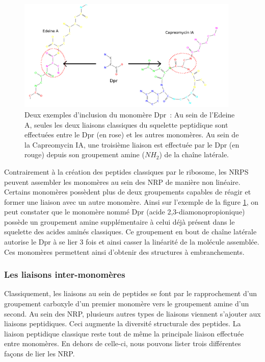 \begin{figure}[h!]
  \begin{center}
    \includegraphics[width=400px]{Figures/bio/Intro/Dpr/2-3_liaisons.png}
    \caption{\label{DPR_incl}Deux exemples d'inclusion du monomère Dpr~:
    Au sein de l'Edeine A, seules les deux liaisons classiques du squelette peptidique sont effectuées entre le Dpr (en rose) et les autres monomères.
    Au sein de la Capreomycin IA, une troisième liaison est effectuée par le Dpr (en rouge) depuis son groupement amine ($NH_2$) de la chaîne latérale.}
  \end{center}
\end{figure}

Contrairement à la création des peptides classiques par le ribosome, les NRPS peuvent assembler les monomères au sein des NRP de manière non linéaire.
Certains monomères possèdent plus de deux groupements capables de réagir et former une liaison avec un autre monomère.
Ainsi sur l'exemple de la figure \ref{DPR_incl}, on peut constater que le monomère nommé Dpr (acide 2,3-diamonopropionique) possède un groupement amine supplémentaire à celui déjà présent dans le squelette des acides aminés classiques.
Ce groupement en bout de chaîne latérale autorise le Dpr à se lier 3 fois et ainsi casser la linéarité de la molécule assemblée.
Ces monomères permettent ainsi d'obtenir des structures à embranchements.


\subsubsection{Les liaisons inter-monomères}

Classiquement, les liaisons au sein de peptides se font par le rapprochement d'un groupement carboxyle d'un premier monomère vers le groupement amine d'un second.
Au sein des NRP, plusieurs autres types de liaisons viennent s'ajouter aux liaisons peptidiques.
Ceci augmente la diversité structurale des peptides.
La liaison peptidique classique reste tout de même la principale liaison effectuée entre monomères.
En dehors de celle-ci, nous pouvons lister trois différentes façons de lier les NRP.

